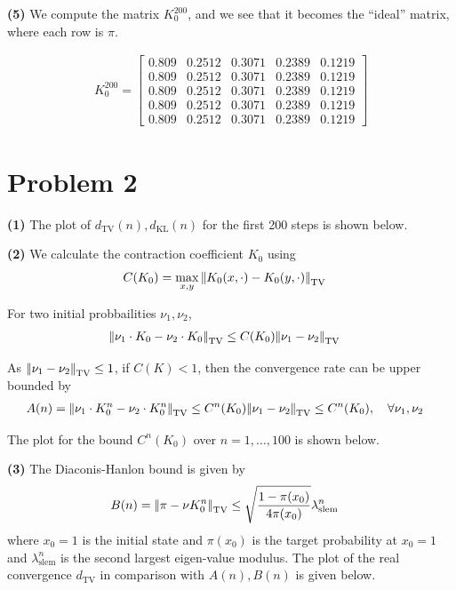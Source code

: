 \documentclass[5pt]{article}
\newcommand{\vertii}[1]{{\left\vert\kern-0.25ex\left\vert #1 
    \right\vert\kern-0.25ex\right\vert}}
\begin{document}
\textbf{(5)} We compute the matrix $K_0^{200}$, and we see that it becomes the ``ideal'' matrix, where each row is $\pi$.

\begin{align*}
K_0^{200} = 
	\begin{bmatrix}
		0.809 & 0.2512 & 0.3071 & 0.2389 & 0.1219 \\		
		0.809 & 0.2512 & 0.3071 & 0.2389 & 0.1219 \\	
		0.809 & 0.2512 & 0.3071 & 0.2389 & 0.1219 \\	
		0.809 & 0.2512 & 0.3071 & 0.2389 & 0.1219 \\	
		0.809 & 0.2512 & 0.3071 & 0.2389 & 0.1219
	\end{bmatrix}
\end{align*}


\section{Problem 2}

\textbf{(1)} The plot of $d_{\mathrm{TV}}(n), d_{\mathrm{KL}}(n)$ for the first 200 steps is shown below.

\textbf{(2)} We calculate the contraction coefficient $K_0$ using
\begin{align}
	& C(K_0) = \max_{x, y} \vertii{K_0(x, \cdot) - K_0(y, \cdot)}_{\mathrm{TV}}
\end{align}

For two initial probbailities $\nu_1, \nu_2$,
\begin{align}
	& \vertii{\nu_1 \cdot K_0 - \nu_2 \cdot K_0}_{\mathrm{TV}} \leq C(K_0) \vertii{\nu_1 - \nu_2}_{\mathrm{TV}}
\end{align}

As $\vertii{\nu_1 - \nu_2}_{\mathrm{TV}} \leq 1$, if $C(K) < 1$, then the convergence rate can be upper bounded by
\begin{align}
	& A(n) = \vertii{\nu_1 \cdot K_0^n - \nu_{2} \cdot K_0^n}_{\mathrm{TV}} 
	\leq C^n(K_0) \vertii{\nu_1 - \nu_2}_{\mathrm{TV}} \leq C^n(K_0), \quad \forall \nu_1, \nu_2
\end{align}

The plot for the bound $C^n(K_0)$ over $n = 1, \ldots, 100$ is shown below.

\textbf{(3)} The Diaconis-Hanlon bound is given by
\begin{align}
	& B(n) = \vertii{\pi - \nu K_0^n}_{\mathrm{TV}} \leq \sqrt{\frac{1 -\pi(x_0)}{4 \pi (x_0)}} \lambda_{\mathrm{slem}}^n
\end{align}
where $x_0 = 1$ is the initial state and $\pi(x_0)$ is the target probability at $x_0 = 1$ and $\lambda_{\mathrm{slem}}^n$ is the second largest eigen-value modulus. The plot of the real convergence $d_{\mathrm{TV}}$ in comparison with $A(n), B(n)$ is given below. \\
\end{document}
